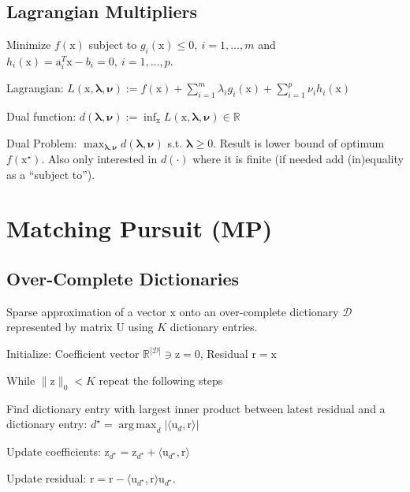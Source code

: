 \documentclass[a4paper, 11pt, landscape]{article}
\newcommand{\matr}[1]{\boldsymbol{\mathrm{#1}}}
\DeclareMathOperator*{\argmax}{arg\,max}
\begin{document}
\begin{multicols*}{3}
\subsection{Lagrangian Multipliers}
Minimize  $f(\matr{x})$ subject to $g_i(\matr{x}) \leq 0,\ i = 1, \ldots, m$ and $h_i(\matr{x}) = \matr{a}_i^T \matr{x} - b_i = 0,\ i = 1, \ldots, p$.
\begin{compactdesc}
	\item[Lagrangian:] $L(\matr{x}, \boldsymbol{\lambda}, \boldsymbol{\nu}) := f(\matr{x}) + \sum_{i=1}^m \lambda_i g_i(\matr{x}) + \sum_{i=1}^p \nu_i h_i(\matr{x})$
	\item[Dual function:] $d(\boldsymbol{\lambda}, \boldsymbol{\nu}) := \inf_{\matr{x}} L(\matr{x}, \boldsymbol{\lambda}, \boldsymbol{\nu}) \in \mathbb{R}$
	\item[Dual Problem:] $\max_{\boldsymbol{\lambda}, \boldsymbol{\nu}} d(\boldsymbol{\lambda}, \boldsymbol{\nu})$ s.t. $\boldsymbol{\lambda} \geq \matr{0}$. Result is lower bound of optimum $f(\matr{x}^\star)$. Also only interested in $d(\cdot)$ where it is finite (if needed add (in)equality as a ``subject to'').
\end{compactdesc}

\section{Matching Pursuit (MP)}
\subsection{Over-Complete Dictionaries}
Sparse approximation of a vector $\matr{x}$ onto an over-complete dictionary $\mathcal{D}$ represented by matrix $\matr{U}$ using $K$ dictionary entries.
\begin{compactenum}
	\item Initialize: Coefficient vector $\mathbb{R}^{|\mathcal{D}|} \ni \matr{z} = \matr{0}$, Residual $\matr{r} = \matr{x}$
	\item While $\|\matr{z}\|_0 < K$ repeat the following steps
	\item Find dictionary entry with largest inner product between latest residual and a dictionary entry: $d^\star = \argmax_d |\langle \matr{u}_d, \matr{r} \rangle|$
	\item Update coefficients: $\matr{z}_{d^\star} = \matr{z}_{d^\star} + \langle \matr{u}_{d^\star}, \matr{r} \rangle$
	\item Update residual: $\matr{r} = \matr{r} - \langle \matr{u}_{d^\star}, \matr{r} \rangle \matr{u}_{d^\star}$.
\end{compactenum}


\end{multicols*}
\end{document}
